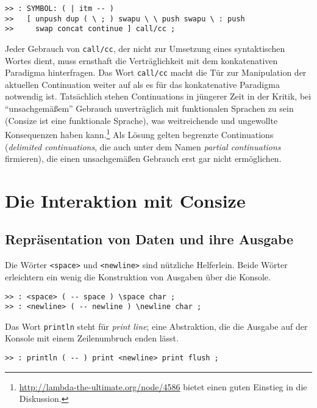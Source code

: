 \begin{verbatim}
>> : SYMBOL: ( | itm -- )
>>   [ unpush dup ( \ ; ) swapu \ \ push swapu \ : push
>>     swap concat continue ] call/cc ;
\end{verbatim}

Jeder Gebrauch von \verb|call/cc|, der nicht zur Umsetzung eines syntaktischen Wortes dient, muss ernsthaft die Verträglichkeit mit dem konkatenativen Paradigma hinterfragen. Das Wort \verb|call/cc| macht die Tür zur Manipulation der aktuellen Continuation weiter auf als es für das konkatenative Paradigma notwendig ist. Tatsächlich stehen Continuations in jüngerer Zeit in der Kritik, bei "`unsachgemäßem"' Gebrauch unverträglich mit funktionalen Sprachen zu sein (Consize ist eine funktionale Sprache), was weitreichende und ungewollte Konsequenzen haben kann.\footnote{\url{http://lambda-the-ultimate.org/node/4586} bietet einen guten Einstieg in die Diskussion.} Als Lösung gelten begrenzte Continuations (\emph{delimited continuations}, die auch unter dem Namen \emph{partial continuations} firmieren), die einen unsachgemäßen Gebrauch erst gar nicht ermöglichen.


\section{Die Interaktion mit Consize}

\subsection{Repräsentation von Daten und ihre Ausgabe}

Die Wörter \verb|<space>| und \verb|<newline>| sind nützliche Helferlein. Beide Wörter erleichtern ein wenig die Konstruktion von Ausgaben über die Konsole. 

\begin{verbatim}
>> : <space> ( -- space ) \space char ;
>> : <newline> ( -- newline ) \newline char ;
\end{verbatim}

Das Wort \verb|println| steht für \emph{print line}; eine Abstraktion, die die Ausgabe auf der Konsole mit einem Zeilenumbruch enden lässt.

\begin{verbatim}
>> : println ( -- ) print <newline> print flush ;
\end{verbatim}

